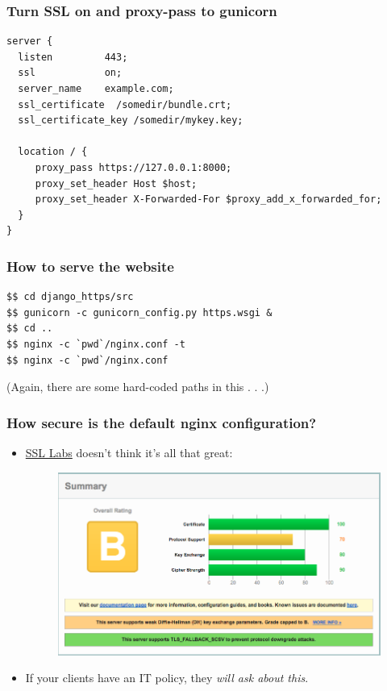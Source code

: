 \documentclass[9pt]{beamer}
\begin{document}
\begin{frame}[fragile]
\frametitle{Turn SSL on and proxy-pass to gunicorn}
\begin{verbatim}
server {
  listen         443;
  ssl            on;
  server_name    example.com;
  ssl_certificate  /somedir/bundle.crt;
  ssl_certificate_key /somedir/mykey.key;

  location / {
     proxy_pass https://127.0.0.1:8000;
     proxy_set_header Host $host;
     proxy_set_header X-Forwarded-For $proxy_add_x_forwarded_for;
  }
}
\end{verbatim}
\end{frame}

\begin{frame}[fragile]
\frametitle{How to serve the website}
\begin{verbatim}
$$ cd django_https/src
$$ gunicorn -c gunicorn_config.py https.wsgi &
$$ cd ..
$$ nginx -c `pwd`/nginx.conf -t
$$ nginx -c `pwd`/nginx.conf 
\end{verbatim}
(Again, there are some hard-coded paths in this . . .)
\end{frame}

\begin{frame}[fragile]
\frametitle{How secure is the default nginx configuration?}
\begin{itemize}
\item \href{https://www.ssllabs.com/ssltest/analyze.html}{SSL Labs} doesn't think it's all that great:

\begin{figure}
\includegraphics[scale=0.25]{figures/SSLLabsFirstGrade.png}
\end{figure}
\pause
\item If your clients have an IT policy, they \emph{will ask about this}.
\end{itemize}
\end{frame}
\end{document}
